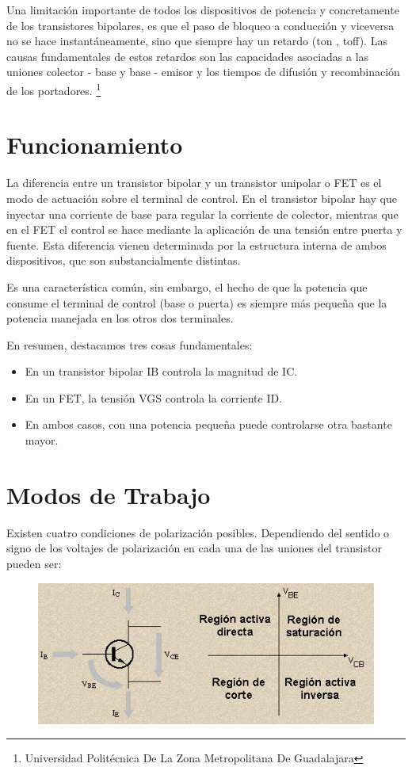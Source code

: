 \documentclass[11pt,a4paper]{article}
\begin{document}
Una limitación importante de todos los dispositivos de potencia y concretamente de los transistores bipolares, es que el paso de bloqueo a conducción y viceversa no se hace instantáneamente, sino que siempre hay un retardo (ton , toff). Las causas fundamentales de estos retardos son las capacidades asociadas a las uniones colector - base y base - emisor y los tiempos de difusión y recombinación de los portadores. 
\footnote{Universidad Politécnica De La Zona Metropolitana De Guadalajara} 

\newpage

\section{Funcionamiento}

La diferencia entre un transistor bipolar y un transistor unipolar o FET es el modo de actuación sobre el terminal de control. En el transistor bipolar hay que inyectar una corriente de base para regular la corriente de colector, mientras que en el FET el control se hace mediante la aplicación de una tensión entre puerta y fuente. Esta diferencia vienen determinada por la estructura interna de ambos dispositivos, que son substancialmente distintas.

Es una característica común, sin embargo, el hecho de que la potencia que consume el terminal de control (base o puerta) es siempre más pequeña que la potencia manejada en los otros dos terminales.

En resumen, destacamos tres cosas fundamentales: 

\begin{itemize}

\item En un transistor bipolar IB controla la magnitud de IC.
\item En un FET, la tensión VGS controla la corriente ID.
\item En ambos casos, con una potencia pequeña puede controlarse otra bastante mayor. 
\end{itemize}

\section{Modos de Trabajo}
Existen cuatro condiciones de polarización posibles. Dependiendo del sentido o signo de los voltajes de polarización en cada una de las uniones del transistor pueden ser:

\begin{figure}[hbtp]
\centering
\includegraphics[scale=0.80]{2.png}
\end{figure}
\end{document}
